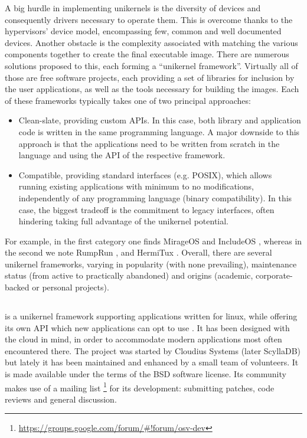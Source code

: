 A big hurdle in implementing unikernels is the diversity of devices and
consequently drivers necessary to operate them. This is overcome thanks to the
hypervisors' device model, encompassing few, common and well documented devices.
Another obstacle is the complexity associated with matching the various
components together to create the final executable image. There are numerous
solutions proposed to this, each forming a ``unikernel framework''. Virtually
all of those are free software projects, each providing a set of libraries for
inclusion by the user applications, as well as the tools necessary for building
the images. Each of these frameworks typically takes one of two principal
approaches:
\begin{itemize}
    \item Clean-slate, providing custom APIs. In this case, both library and
          application code is written in the same programming language. A major
          downside to this approach is that the applications need to be written
          from scratch in the language and using the API of the respective
          framework.
    \item Compatible, providing standard interfaces (e.g. POSIX), which allows
          running existing applications with minimum to no modifications,
          independently of any programming language (binary compatibility). In
          this case, the biggest tradeoff is the commitment to legacy
          interfaces, often hindering taking full advantage of the unikernel
          potential.
\end{itemize}
For example, in the first category one finds MirageOS \cite{mirageos} and
IncludeOS \cite{includeos}, whereas in the second we note RumpRun
\cite{rumprun}, \osv{} \cite{osv} and HermiTux \cite{hermitux}. Overall, there
are several unikernel frameworks, varying in popularity (with none prevailing),
maintenance status (from active to practically abandoned) and origins (academic,
corporate-backed or personal projects).


\subsection{\osv{}}

\osv{} is a unikernel framework supporting applications written for linux,
while offering its own API which new applications can opt to use \cite{osv}.
It has been designed with the cloud in mind, in order to accommodate modern
applications most often encountered there. The project was started by Cloudius
Systems (later ScyllaDB) but lately it has been maintained and enhanced by a
small team of volunteers. It is made available under the terms of the BSD
software license. Its community makes use of a mailing list%
\footnote{\url{https://groups.google.com/forum/\#!forum/osv-dev}} for its
development: submitting patches, code reviews and general discussion.

